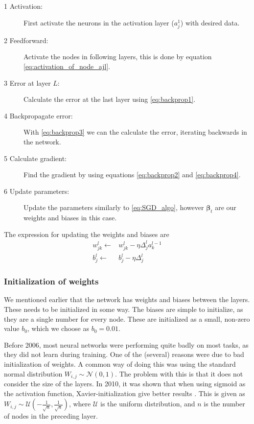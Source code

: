 \documentclass[12pt]{extarticle}
\begin{document}
\begin{description}
	\item[1 Activation:] First activate the neurons in the activation layer ($a^1_j$) with desired data.
	\item[2 Feedforward:] Activate the nodes in following layers, this is done by equation \eqref{eq:activation_of_node_ajl}.
	\item[3 Error at layer $L$:] Calculate the error at the last layer using \eqref{eq:backprop1}.
	\item[4 Backpropagate error:] With \eqref{eq:backprop3} we can the calculate the error, iterating backwards in the network.
	\item[5 Calculate gradient:] Find the gradient by using equations \eqref{eq:backprop2} and \eqref{eq:backprop4}.
	\item[6 Update parameters:] Update the parameters similarly to \eqref{eq:SGD_algo}, however $\boldsymbol{\beta}_t$ are our weights and biases in this case.
\end{description}

The expression for updating the weights and biases are
\begin{align}
	w_{jk}^l \leftarrow & w_{jk}^l - \eta \Delta_j^l a_k^{l-1} \label{eq:update_weights} \\
	b_j^l \leftarrow    & b_j^l - \eta \Delta_j^l \label{eq:update_biases}
\end{align}

\subsubsection{Initialization of weights} \label{sec:wi}
We mentioned earlier that the network has weights and biases between the layers. These needs to be initialized in some way. The biases are simple to initialize, as they are a single number for every node. These are initialized as a small, non-zero value $b_0$, which we choose as $b_0=0.01$.

Before 2006, most neural networks were performing quite badly on most tasks, as they did not learn during training. One of the (several) reasons were due to bad initialization of weights. A common way of doing this was using the standard normal distribution $W_{i,j} \sim  \mathcal{N}(0, 1)$. The problem with this is that it does not consider the size of the layers. In 2010, it was shown that when using sigmoid as the activation function, Xavier-initialization give better results \cite{xavier}. This is given as $W_{i, j}\sim\mathcal{U} \left(-\frac{1}{\sqrt{n}}, \frac{1}{\sqrt{n}} \right)$, where $\mathcal{U}$ is the uniform distribution, and $n$ is the number of nodes in the preceding layer.
\end{document}
